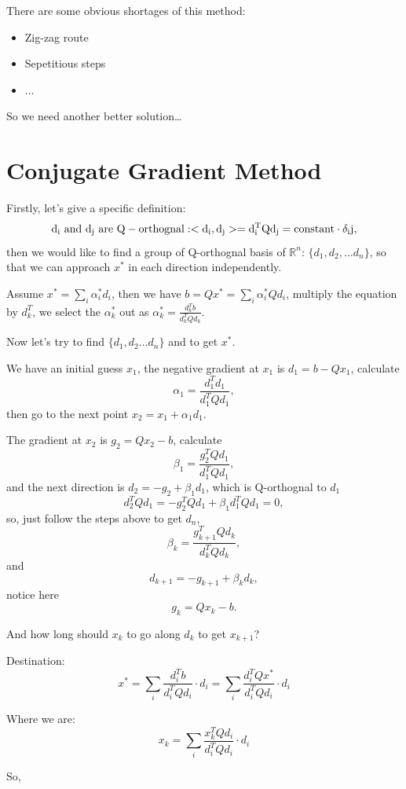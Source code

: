 \documentclass[11pt]{article} %
\begin{document}
There are some obvious shortages of this method: 

\begin{itemize}
    \item Zig-zag route
    \item Sepetitious steps
    \item ...
\end{itemize}

So we need another better solution\dots

\section{Conjugate Gradient Method}

\noindent

Firstly, let's give a specific definition:
\[
    \rm{d_i\ and\ d_j\ are\ Q-orthognal}: <d_i, d_j> = d_i^T Q d_j = constant \cdot \delta_ij,   
\]
then we would like to find a group of Q-orthognal basis of $\mathbb{R}^n$: $\{ d_1, d_2, \dots d_n\}$, so that we can approach $x^*$ in each direction independently.

Assume $x^* = \sum_i \alpha^*_i d_i$, then we have $b = Q x^* = \sum_i \alpha^*_i Q d_i$, multiply the equation by $d_k^T$, we select the $\alpha^*_k$ out as $\alpha^*_k = \frac{d_k^T b}{d_k^T Q d_k}$.

Now let's try to find $\{ d_1, d_2 \dots d_n \}$ and to get $x^*$.

We have an initial guess $x_1$, the negative gradient at $x_1$ is $d_1 = b - Q x_1$, calculate
\[ \alpha_1 = \frac{d_1^T d_1}{d_1^T Q d_1}, \]
then go to the next point $x_2 = x_1 + \alpha_1 d_1$.

The gradient at $x_2$ is $g_2 = Q x_2 - b$, calculate
\[ \beta_1 = \frac{g_2^T Q d_1}{d_1^T Q d_1}, \]
and the next direction is $d_2 = -g_2 + \beta_1 d_1$, which is Q-orthognal to $d_1$
\[ d_2^T Q d_1 = -g_2^T Q d_1 + \beta_1 d_1^T Q d_1 = 0, \]
so, just follow the steps above to get $d_n$,
\[\beta_k = \frac{g^T_{k+1}Qd_k}{d_k^T Q d_k}, \]
and
\[ d_{k+1} = -g_{k+1} + \beta_k d_k, \]
notice here
\[ g_k = Q x_k - b. \]

And how long should $x_k$ to go along $d_k$ to get $x_{k+1}$?

Destination:
\[ x^* = \sum_i \frac{d_i^T b}{d_i^T Q d_i} \cdot d_i = \sum_i \frac{d_i^T Q x^*}{d_i^T Q d_i} \cdot d_i \]

Where we are:
\[ x_k = \sum_i \frac{x_k^T Q d_i}{d_i^T Q d_i} \cdot d_i \]

So, 
\end{document}
